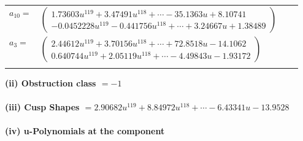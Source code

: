 \documentclass[1p]{elsarticle_modified}
\theoremstyle{definition}
\begin{document}
\begin{tabular}{m{7pt} m{180pt} m{7pt} m{180pt} }
\flushright $a_{10}=$&$\begin{pmatrix}1.73603 u^{119}+3.47491 u^{118}+\cdots-35.1363 u+8.10741\\-0.0452228 u^{119}-0.441756 u^{118}+\cdots+3.24667 u+1.38489\end{pmatrix}$ \\
\flushright $a_{3}=$&$\begin{pmatrix}2.44612 u^{119}+3.70156 u^{118}+\cdots+72.8518 u-14.1062\\0.640744 u^{119}+2.05119 u^{118}+\cdots-4.49843 u-1.93172\end{pmatrix}$\\&\end{tabular}
\flushleft \textbf{(ii) Obstruction class $= -1$}\\~\\
\flushleft \textbf{(iii) Cusp Shapes $= 2.90682 u^{119}+8.84972 u^{118}+\cdots-6.43341 u-13.9528$}\\~\\
\newpage\renewcommand{\arraystretch}{1}
\flushleft \textbf{(iv) u-Polynomials at the component}\newline \\
\end{document}
